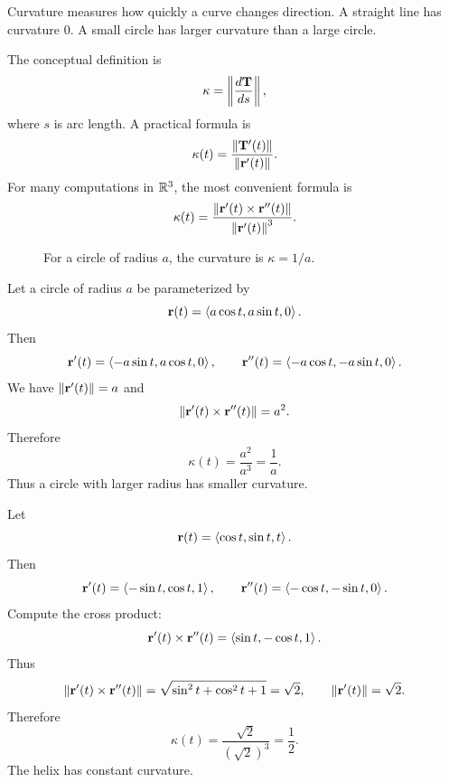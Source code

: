 Curvature measures how quickly a curve changes direction. A straight line has curvature $0$. A small circle has larger curvature than a large circle.

The conceptual definition is
\[
\kappa=\left\lVert \frac{d\mathbf T}{ds}\right\rVert,
\]
where $s$ is arc length. A practical formula is
\[
\kappa(t)=\frac{\left\lVert \mathbf T'(t)\right\rVert}{\left\lVert \mathbf r'(t)\right\rVert}.
\]
For many computations in $\mathbb{R}^3$, the most convenient formula is
\[
\kappa(t)=\frac{\left\lVert \mathbf r'(t)\times\mathbf r''(t)\right\rVert}{\left\lVert \mathbf r'(t)\right\rVert^3}.
\]

\begin{figure}[H]
\centering
{}
\caption{For a circle of radius $a$, the curvature is $\kappa=1/a$.}
\label{fig:curvature-circles}
\end{figure}

\begin{examplebox}[title={Example 5.11: Curvature of a circle}]
Let a circle of radius $a$ be parameterized by
\[
\mathbf r(t)=\left\langle a\cos t,a\sin t,0\right\rangle.
\]
Then
\[
\mathbf r'(t)=\left\langle -a\sin t,a\cos t,0\right\rangle,
\qquad
\mathbf r''(t)=\left\langle -a\cos t,-a\sin t,0\right\rangle.
\]
We have $\left\lVert \mathbf r'(t)\right\rVert=a$ and
\[
\left\lVert \mathbf r'(t)\times\mathbf r''(t)\right\rVert=a^2.
\]
Therefore
\[
\kappa(t)=\frac{a^2}{a^3}=\frac1a.
\]
Thus a circle with larger radius has smaller curvature.
\end{examplebox}

\begin{examplebox}[title={Example 5.12: Curvature of the circular helix}]
Let
\[
\mathbf r(t)=\left\langle \cos t,\sin t,t\right\rangle.
\]
Then
\[
\mathbf r'(t)=\left\langle -\sin t,\cos t,1\right\rangle,
\qquad
\mathbf r''(t)=\left\langle -\cos t,-\sin t,0\right\rangle.
\]
Compute the cross product:
\[
\mathbf r'(t)\times\mathbf r''(t)=\left\langle \sin t,-\cos t,1\right\rangle.
\]
Thus
\[
\left\lVert \mathbf r'(t)\times\mathbf r''(t)\right\rVert=\sqrt{\sin^2t+\cos^2t+1}=\sqrt2,
\qquad
\left\lVert \mathbf r'(t)\right\rVert=\sqrt2.
\]
Therefore
\[
\kappa(t)=\frac{\sqrt2}{(\sqrt2)^3}=\frac12.
\]
The helix has constant curvature.
\end{examplebox}

